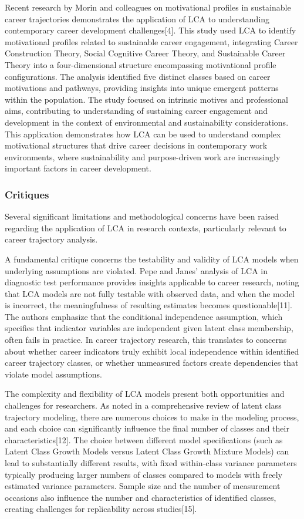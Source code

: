 \documentclass[main.tex]{subfiles}
\begin{document}
Recent research by Morin and colleagues on motivational profiles in sustainable career trajectories demonstrates the application of LCA to understanding contemporary career development challenges[4]. This study used LCA to identify motivational profiles related to sustainable career engagement, integrating Career Construction Theory, Social Cognitive Career Theory, and Sustainable Career Theory into a four-dimensional structure encompassing motivational profile configurations. The analysis identified five distinct classes based on career motivations and pathways, providing insights into unique emergent patterns within the population. The study focused on intrinsic motives and professional aims, contributing to understanding of sustaining career engagement and development in the context of environmental and sustainability considerations. This application demonstrates how LCA can be used to understand complex motivational structures that drive career decisions in contemporary work environments, where sustainability and purpose-driven work are increasingly important factors in career development.

\subsubsection{Critiques}

Several significant limitations and methodological concerns have been raised regarding the application of LCA in research contexts, particularly relevant to career trajectory analysis.

A fundamental critique concerns the testability and validity of LCA models when underlying assumptions are violated. Pepe and Janes' analysis of LCA in diagnostic test performance provides insights applicable to career research, noting that LCA models are not fully testable with observed data, and when the model is incorrect, the meaningfulness of resulting estimates becomes questionable[11]. The authors emphasize that the conditional independence assumption, which specifies that indicator variables are independent given latent class membership, often fails in practice. In career trajectory research, this translates to concerns about whether career indicators truly exhibit local independence within identified career trajectory classes, or whether unmeasured factors create dependencies that violate model assumptions.

The complexity and flexibility of LCA models present both opportunities and challenges for researchers. As noted in a comprehensive review of latent class trajectory modeling, there are numerous choices to make in the modeling process, and each choice can significantly influence the final number of classes and their characteristics[12]. The choice between different model specifications (such as Latent Class Growth Models versus Latent Class Growth Mixture Models) can lead to substantially different results, with fixed within-class variance parameters typically producing larger numbers of classes compared to models with freely estimated variance parameters. Sample size and the number of measurement occasions also influence the number and characteristics of identified classes, creating challenges for replicability across studies[15].
\end{document}
